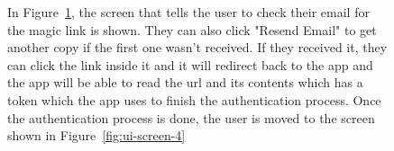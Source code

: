 \begin{figure}[!h]
\begin{minipage}{0.3\textwidth}
        \label{fig:ui-screen-3}
    \end{minipage}
    \hfill
    \begin{minipage}{0.65\textwidth}
        In Figure~\ref{fig:ui-screen-3}, the screen that tells the user to check their email for the magic link is shown. They can also click "Resend Email" to get another copy if the first one wasn't received. If they received it, they can click the link inside it and it will redirect back to the app and the app will be able to read the url and its contents which has a token which the app uses to finish the authentication process. Once the authentication process is done, the user is moved to the screen shown in Figure~\ref{fig:ui-screen-4}
    \end{minipage}
\end{figure}

